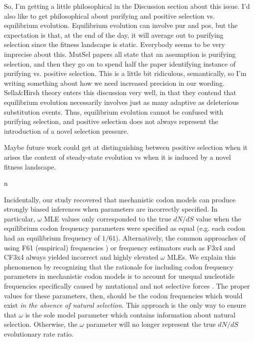 \documentclass[11pt]{article}
\begin{document}
So, I'm getting a little philosophical in the Discussion section about this issue. I'd also like to get philosophical about purifying and positive selection vs. equilibrium evolution. Equilibrium evolution can involve pur and pos, but the expectation is that, at the end of the day, it will average out to purifying selection since the fitness landscape is static. Everybody seems to be very imprecise about this. MutSel papers all state that an assumption is purifying selection, and then they go on to spend half the paper identifying instance of purifying vs. positive selection. This is a little bit ridiculous, semantically, so I'm writing something about how we need increased precision in our wording. Sella&Hirsh theory enters this discussion very well, in that they contend that equilibrium evolution necessarily involves just as many adaptive as deleterious substitution events. Thus, equilibrium evolution cannot be confused with purifying selection, and positive selection does not always represent the introduction of a novel selection pressure.

Maybe future work could get at distinguishing between positive selection when it arises the context of steady-state evolution vs when it is induced by a novel fitness landscape.

n




Incidentally, our study recovered that mechanistic codon models can produce strongly biased inferences when parameters are incorrectly specified. In particular, $\omega$ MLE values only corresponded to the true $dN/dS$ value when the equilibrium codon frequency parameters were specified as equal (e.g. each codon had an equilibrium frequency of $1/61$). Alternatively, the common approaches of using F61 (empirical) frequencies \cite{GoldmanYang1994}) or frequency estimators such as F3x4 \cite{MuseGaut1994} and CF3x4 \cite{Pond2010} always yielded incorrect and highly elevated $\omega$ MLEs. We explain this phenomenon by recognizing that the rationale for including codon frequency parameters in mechanistic codon  models is to account for unequal nucleotide frequencies specifically caused by mutational and not selective forces \cite{YN00, Yang2006}. The proper values for these parameters, then, should be the codon frequencies which would exist \textit{in the absence of natural selection}. This approach is the only way to ensure that $\omega$ is the sole model parameter which contains information about natural selection. Otherwise, the $\omega$ parameter will no longer represent the true $dN/dS$ evolutionary rate ratio.
\end{document}
